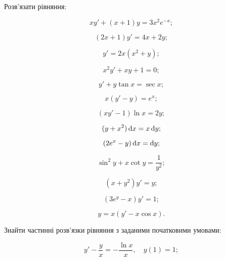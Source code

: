 Розв'язати рівняння:
\begin{multicols}{2}
	\begin{problem}
		\[x y' + (x + 1) y = 3 x^2 e^{-x};\]
	\end{problem}
	
	\begin{problem}
		\[(2x + 1) y' =4x+2y;\]
	\end{problem}
	
	\begin{problem}
		\[y'=2x(x^2+y);\]
	\end{problem}
	
	\begin{problem}
		\[x^2y'+xy+1=0;\]
	\end{problem}
	
	\begin{problem}
		\[y'+y\tan x=\sec x;\]
	\end{problem}
	
	\begin{problem}
		\[x(y'-y)=e^x;\]
	\end{problem}
	
	\begin{problem}
		\[(xy'-1)\ln x=2y;\]
	\end{problem}
	
	\begin{problem}
		\[(y+x^2) \mathop{}\!\mathrm{d} x=x \mathop{}\!\mathrm{d} y;\]
	\end{problem}
	
	\begin{problem}
		\[(2e^x-y)\mathop{}\!\mathrm{d} x=\mathop{}\!\mathrm{d} y;\]
	\end{problem}
	
	\begin{problem}
		\[\sin^2 y + x \cot y = \frac1{y^2};\]
	\end{problem}
	
	\begin{problem}
		\[(x+y^2) y'=y;\]
	\end{problem}
	
	\begin{problem}
		\[(3e^y-x) y' = 1;\]
	\end{problem}
	
	\begin{problem}
		\[y = x(y'- x \cos x).\]
	\end{problem}
\end{multicols}

Знайти частинні розв'язки рівняння з заданими початковими умовами:
\begin{problem}
	\[y'-\frac yx=-\frac{\ln x}x, \quad y(1)=1;\]
\end{problem}

